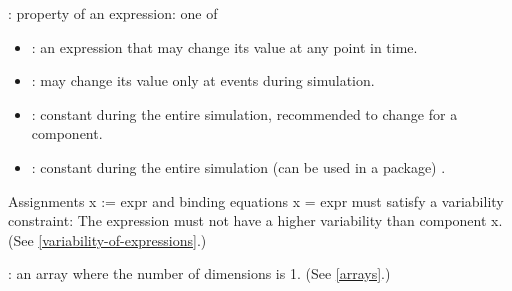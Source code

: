 : property of an expression: one of
\begin{itemize}
\item {}: an expression that may change its value at any
point in time.
\item {}: may change its value only at events during
simulation.
\item {}: constant during the entire simulation, recommended
to change for a component.
\item {}: constant during the entire simulation (can be used
in a package) .
\end{itemize}

Assignments x := expr and binding equations x = expr must satisfy a
variability constraint: The expression must not have a higher
variability than component x. (See \cref{variability-of-expressions}.)

: an array where the number of dimensions is 1. (See
\cref{arrays}.)
